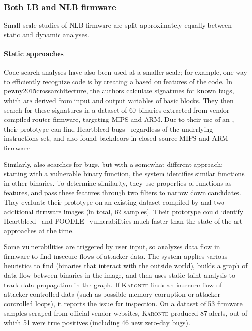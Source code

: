 \subsubsection{Both LB and NLB firmware}
Small-scale studies of NLB firmware are split approximately equally between static and dynamic analyses.

\paragraph{Static approaches}
Code search analyses have also been used at a smaller scale; for example, one way to efficiently recognize code is by creating a  based on features of the code.
In \citet{Cross-Architecture Bug Search}{pewny2015crossarchitecture}, the authors calculate signatures for known bugs, which are derived from input and output variables of basic blocks.
They then search for these signatures in a dataset of \num{60} binaries extracted from vendor-compiled router firmware, targeting MIPS and ARM.
Due to their use of an , their prototype can find Heartbleed bugs~\cite{heartbleed} regardless of the underlying instructions set, and also found backdoors in closed-source MIPS and ARM firmware.

Similarly,  also searches for bugs, but with a somewhat different approach: starting with a vulnerable binary function, the system identifies similar functions in other binaries.
To determine similarity, they use properties of functions as features, and pass these features through two filters to narrow down candidates.
They evaluate their prototype on an existing dataset compiled by  and two additional firmware images (in total, \num{62} samples).
Their prototype could identify Heartbleed~\cite{heartbleed} and POODLE~\cite{poodle} vulnerabilities much faster than the state-of-the-art approaches at the time.

Some vulnerabilities are triggered by user input, so  analyzes data flow in firmware to find insecure flows of attacker data.
The system applies various heuristics to find  (binaries that interact with the outside world), builds a graph of data flow between binaries in the image, and then uses static taint analysis to track data propagation in the graph.
If \textsc{Karonte} finds an insecure flow of attacker-controlled data (such as possible memory corruption or attacker-controlled loops), it reports the issue for inspection.
On a dataset of \num{53} firmware samples scraped from official vendor websites, \textsc{Karonte} produced \num{87} alerts, out of which \num{51} were true positives (including \num{46} new zero-day bugs).

